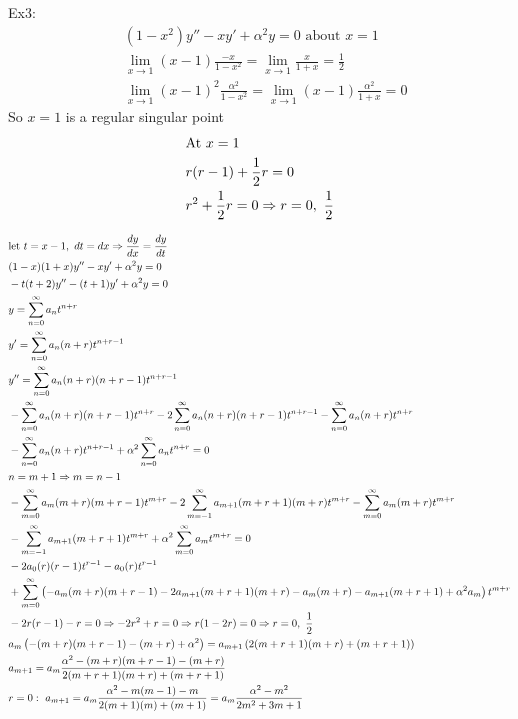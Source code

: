 \documentclass[11pt, fleqn]{article}
\begin{document}
Ex3:
\begin{align*}
    &(1-x^2)y''-xy'+\alpha^2y=0\text{ about $x=1$}\\
    &\lim_{x\to1}(x-1)\frac{-x}{1-x^2}=\lim_{x\to1}\frac{x}{1+x}=\frac{1}{2}\\
    &\lim_{x\to1}(x-1)^2\frac{\alpha^2}{1-x^2}=\lim_{x\to1}(x-1)\frac{\alpha^2}{1+x}=0
\end{align*}
So $x=1$ is a regular singular point
\begin{align*}
    &\text{At }x=1\\
    &r(r-1)+\frac{1}{2}r=0\\
    &r^2+\frac{1}{2}r=0\Rightarrow r=0,\ \frac{1}{2}
\end{align*}
\begin{small}
\begin{align*}
    &\text{let }t=x-1,\ dt=dx\Ra \frac{dy}{dx}=\frac{dy}{dt}\\
    &(1-x)(1+x)y''-xy'+\alpha^2y=0\\
    &-t(t+2)y''-(t+1)y'+\alpha^2y=0\\
    &y=\sum_{n=0}^\infty a_nt^{n+r}\\
    &y'=\sum_{n=0}^\infty a_n(n+r)t^{n+r-1}\\
    &y''=\sum_{n=0}^\infty a_n(n+r)(n+r-1)t^{n+r-1}\\
    &-\sum_{n=0}^\infty a_n(n+r)(n+r-1)t^{n+r}-2\sum_{n=0}^\infty a_n(n+r)(n+r-1)t^{n+r-1}-\sum_{n=0}^\infty a_n(n+r)t^{n+r}\\
    &-\sum_{n=0}^\infty a_n(n+r)t^{n+r-1}+\alpha^2\sum_{n=0}^\infty a_nt^{n+r}=0\\
    &n=m+1\Ra m=n-1\\
    &-\sum_{m=0}^\infty a_m(m+r)(m+r-1)t^{m+r}-2\sum_{m=-1}^\infty a_{m+1}(m+r+1)(m+r)t^{m+r}-\sum_{m=0}^\infty a_m(m+r)t^{m+r}\\
    &-\sum_{m=-1}^\infty a_{m+1}(m+r+1)t^{m+r}+\alpha^2\sum_{m=0}^\infty a_mt^{m+r}=0\\
    &-2a_0(r)(r-1)t^{r-1}-a_0(r)t^{r-1}\\
    &+\sum_{m=0}^\infty \brround{-a_m(m+r)(m+r-1)-2a_{m+1}(m+r+1)(m+r)-a_m(m+r)-a_{m+1}(m+r+1)+\alpha^2 a_m}t^{m+r}\\
    &-2r(r-1)-r=0\Ra -2r^2+r=0\Ra r(1-2r)=0\Ra r=0,\ \frac{1}{2}\\
    &a_m\brround{-(m+r)(m+r-1)-(m+r)+\alpha^2}=a_{m+1}\brround{2(m+r+1)(m+r)+(m+r+1)}\\
    &a_{m+1}=a_m\frac{\alpha^2-(m+r)(m+r-1)-(m+r)}{2(m+r+1)(m+r)+(m+r+1)}\\
    &r=0:\ a_{m+1}=a_m\frac{\alpha^2-m(m-1)-m}{2(m+1)(m)+(m+1)}=a_m\frac{\alpha^2-m^2}{2m^2+3m+1}\\

\end{align*}
\end{small}
\end{document}
